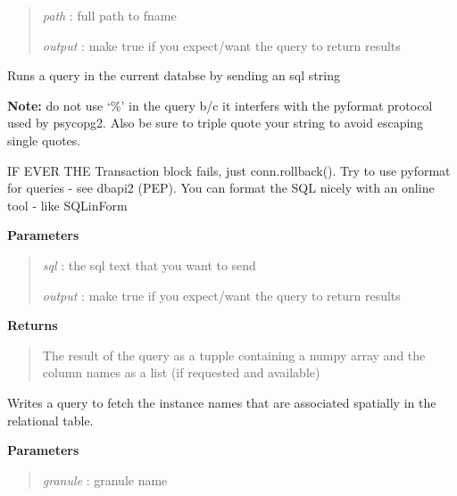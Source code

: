 \documentclass[letterpaper,10pt,openany,oneside]{sphinxmanual}
\begin{document}
\begin{fulllineitems}
\begin{fulllineitems}
\begin{quote}
\emph{path}   : full path to fname

\emph{output} : make true if you expect/want the query to return results
\end{quote}

\end{fulllineitems}


\begin{fulllineitems}
\label{code:Database.Database.qryFromText}
Runs a query in the current databse by sending an sql string

\textbf{Note:} do not use `\%' in the query b/c it interfers with the pyformat protocol
used by psycopg2. Also be sure to triple quote your string to avoid escaping single quotes.

IF EVER THE Transaction block fails, just conn.rollback(). Try to use pyformat for queries - see dbapi2 (PEP).
You can format the SQL nicely with an online tool - like SQLinForm

\textbf{Parameters}
\begin{quote}

\emph{sql}    : the sql text that you want to send

\emph{output} : make true if you expect/want the query to return results
\end{quote}

\textbf{Returns}
\begin{quote}

The result of the query as a tupple containing a numpy array and the column names as a list (if requested and available)
\end{quote}

\end{fulllineitems}


\begin{fulllineitems}
\label{code:Database.Database.qryGetInstances}
Writes a query to fetch the instance names that are
associated spatially in the relational table.

\textbf{Parameters}
\begin{quote}

\emph{granule}    : granule name


\end{quote}
\end{fulllineitems}
\end{fulllineitems}
\end{document}
